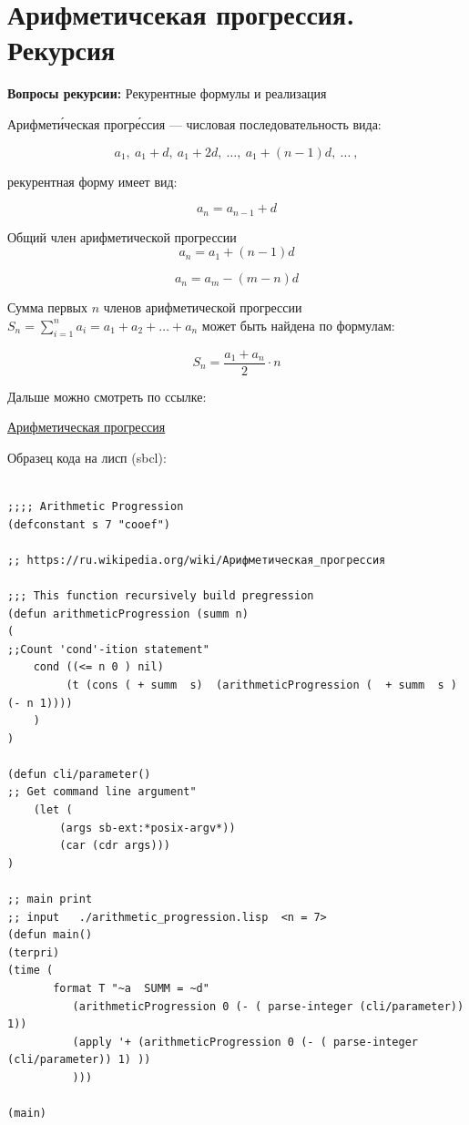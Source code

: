 \documentclass[12pt, leqno]{article}
\begin{document}
\section*{Арифметичсекая прогрессия. Рекурсия}
\begin{flushleft}
\textbf{Вопросы рекурсии:} Рекурентные формулы и реализация
\end{flushleft}

Арифмети́ческая прогре́ссия — числовая последовательность вида: 

\begin{equation}
a_{1},\ a_{1}+d,\ a_{1}+2d,\ \ldots ,\ a_{1}+(n-1)d,\ \ldots \ ,
\end{equation}

рекурентная форму имеет вид:


\begin{equation}
a_{n}=a_{n-1}+d
\end{equation}

Общий член арифметической прогрессии
\begin{equation}
a_{n}=a_{1}+(n-1)d 
\end{equation}

\begin{equation}
a_{n}=a_{m}-(m-n)d
\end{equation}

Сумма первых $ n $ членов арифметической прогрессии  
$ S_{n}=\sum _{i=1}^{n}a_{i}=a_{1}+a_{2}+\ldots +a_{n} $ 
может быть найдена по формулам: 

\begin{equation}
S_{n}={\dfrac {a_{1}+a_{n}}{2}}\cdot n 
\end{equation}

Дальше можно смотреть по ссылке:

\href{https://ru.wikipedia.org/wiki/Арифметическая_прогрессия}{Арифметическая прогрессия}


\clearpage 

\noindent Образец кода на лисп (sbcl):  
 
\begin{verbatim}

;;;; Arithmetic Progression
(defconstant s 7 "cooef")

;; https://ru.wikipedia.org/wiki/Арифметическая_прогрессия

;;; This function recursively build pregression
(defun arithmeticProgression (summ n)
(
;;Count 'cond'-ition statement"                 
    cond ((<= n 0 ) nil)
         (t (cons ( + summ  s)  (arithmeticProgression (  + summ  s ) (- n 1)))) 
    )
)

(defun cli/parameter()
;; Get command line argument" 
    (let (
        (args sb-ext:*posix-argv*))
        (car (cdr args)))
)

;; main print
;; input   ./arithmetic_progression.lisp  <n = 7>
(defun main()
(terpri)
(time (
       format T "~a  SUMM = ~d"
          (arithmeticProgression 0 (- ( parse-integer (cli/parameter)) 1))
          (apply '+ (arithmeticProgression 0 (- ( parse-integer (cli/parameter)) 1) ))
          )))

(main)


\end{verbatim}  
\end{document}
